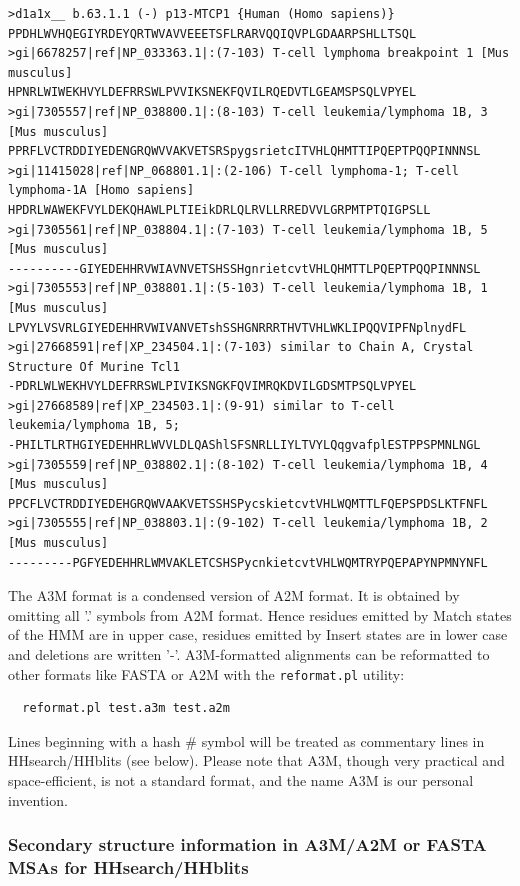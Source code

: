 \documentclass[11pt,a4paper]{article}
\begin{document}
\scriptsize
\begin{verbatim}
>d1a1x__ b.63.1.1 (-) p13-MTCP1 {Human (Homo sapiens)}
PPDHLWVHQEGIYRDEYQRTWVAVVEEETSFLRARVQQIQVPLGDAARPSHLLTSQL
>gi|6678257|ref|NP_033363.1|:(7-103) T-cell lymphoma breakpoint 1 [Mus musculus]
HPNRLWIWEKHVYLDEFRRSWLPVVIKSNEKFQVILRQEDVTLGEAMSPSQLVPYEL
>gi|7305557|ref|NP_038800.1|:(8-103) T-cell leukemia/lymphoma 1B, 3 [Mus musculus]
PPRFLVCTRDDIYEDENGRQWVVAKVETSRSpygsrietcITVHLQHMTTIPQEPTPQQPINNNSL
>gi|11415028|ref|NP_068801.1|:(2-106) T-cell lymphoma-1; T-cell lymphoma-1A [Homo sapiens]
HPDRLWAWEKFVYLDEKQHAWLPLTIEikDRLQLRVLLRREDVVLGRPMTPTQIGPSLL
>gi|7305561|ref|NP_038804.1|:(7-103) T-cell leukemia/lymphoma 1B, 5 [Mus musculus]
----------GIYEDEHHRVWIAVNVETSHSSHgnrietcvtVHLQHMTTLPQEPTPQQPINNNSL
>gi|7305553|ref|NP_038801.1|:(5-103) T-cell leukemia/lymphoma 1B, 1 [Mus musculus]
LPVYLVSVRLGIYEDEHHRVWIVANVETshSSHGNRRRTHVTVHLWKLIPQQVIPFNplnydFL
>gi|27668591|ref|XP_234504.1|:(7-103) similar to Chain A, Crystal Structure Of Murine Tcl1
-PDRLWLWEKHVYLDEFRRSWLPIVIKSNGKFQVIMRQKDVILGDSMTPSQLVPYEL
>gi|27668589|ref|XP_234503.1|:(9-91) similar to T-cell leukemia/lymphoma 1B, 5;
-PHILTLRTHGIYEDEHHRLWVVLDLQAShlSFSNRLLIYLTVYLQqgvafplESTPPSPMNLNGL
>gi|7305559|ref|NP_038802.1|:(8-102) T-cell leukemia/lymphoma 1B, 4 [Mus musculus] 
PPCFLVCTRDDIYEDEHGRQWVAAKVETSSHSPycskietcvtVHLWQMTTLFQEPSPDSLKTFNFL
>gi|7305555|ref|NP_038803.1|:(9-102) T-cell leukemia/lymphoma 1B, 2 [Mus musculus]
---------PGFYEDEHHRLWMVAKLETCSHSPycnkietcvtVHLWQMTRYPQEPAPYNPMNYNFL
\end{verbatim}\normalsize

The A3M format is a condensed version of A2M format. It is obtained by omitting all '.' 
symbols from A2M format. Hence residues emitted by Match states of the HMM are in upper 
case, residues emitted by Insert states are in lower case and deletions are written '-'.
A3M-formatted alignments can be reformatted to other formats like FASTA or A2M with 
the \verb`reformat.pl` utility:
\begin{verbatim}
  reformat.pl test.a3m test.a2m
\end{verbatim}
Lines beginning with a hash \# symbol will be treated as commentary lines in HHsearch/HHblits
(see below). Please note that A3M, though very practical and space-efficient, 
is not a standard format, and the name A3M is our personal invention.

\subsubsection*{Secondary structure information in A3M/A2M or FASTA MSAs for HHsearch/HHblits}
\end{document}
